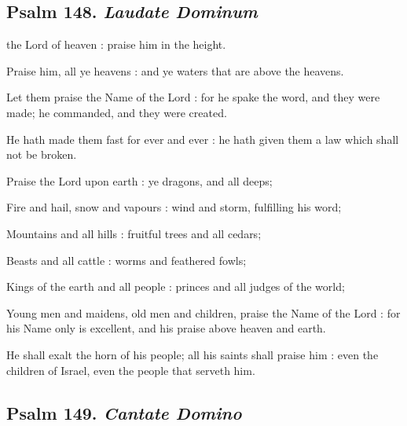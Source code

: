 \subsection{Psalm 148. \textit{Laudate Dominum}}

 the Lord of heaven : praise him in the height.\par
{}
Praise him, all ye heavens : and ye waters that are above the heavens.\par
{}Let them praise the Name of the Lord : for he spake the word, and they were made; he commanded, and they were created.\par
{}He hath made them fast for ever and ever : he hath given them a law which shall not be broken.\par
{}Praise the Lord upon earth : ye dragons, and all deeps;\par
{}Fire and hail, snow and vapours : wind and storm, fulfilling his word;\par
{}Mountains and all hills : fruitful trees and all cedars;\par
{}Beasts and all cattle : worms and feathered fowls;\par
{}Kings of the earth and all people : princes and all judges of the world;\par
{}Young men and maidens, old men and children, praise the Name of the Lord : for his Name only is excellent, and his praise above heaven and earth.\par
{}He shall exalt the horn of his people; all his saints shall praise him : even the children of Israel, even the people that serveth him.\par

\clearpage
\subsection{Psalm 149. \textit{Cantate Domino}}

